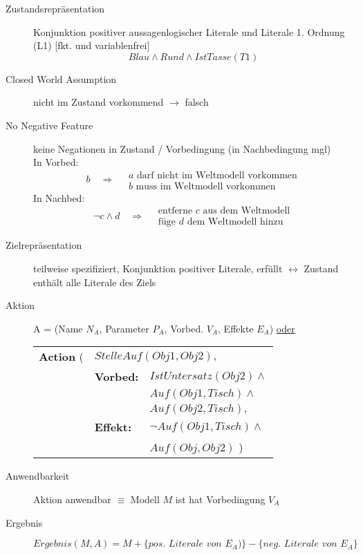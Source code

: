 \begin{description}
	\item[Zustandsrepräsentation] Konjunktion positiver aussagenlogischer Literale und Literale 1. Ordnung (L1) [fkt. und variablenfrei] $$Blau \wedge Rund \wedge IstTasse(T1)$$
	\item[Closed World Assumption] nicht im Zustand vorkommend $\to$ falsch
	\item[No Negative Feature] keine Negationen in Zustand / Vorbedingung (in Nachbedingung mgl) \\
	In Vorbed: $$b \quad \Rightarrow \quad \begin{array}{l} a \textrm{ darf nicht im Weltmodell vorkommen} \\ b \textrm{ muss im Weltmodell vorkommen} \end{array}$$
	In Nachbed: $$\neg c \wedge d \quad \Rightarrow \quad \begin{array}{l} \textrm{entferne } c \textrm{ aus dem Weltmodell} \\ \textrm{füge } d \textrm{ dem Weltmodell hinzu} \end{array}$$
	\item[Zielrepräsentation] teilweise spezifiziert, Konjunktion positiver Literale, erfüllt $\leftrightarrow$ Zustand enthält alle Literale des Ziels
	\item[Aktion] A = (Name $N_A$, Parameter $P_A$, Vorbed. $V_A$, Effekte $E_A$) \underline{oder} 
\begin{center}
\begin{tabular}{lll}
\textbf{Action} ( & \multicolumn{2}{l}{$StelleAuf(Obj1, Obj2),$} \\
& \textbf{Vorbed:} & $IstUntersatz(Obj2) \wedge$ \\ && $Auf(Obj1, Tisch) \wedge$ \\ && $Auf(Obj2, Tisch),$ \\
& \textbf{Effekt:} & $\neg Auf(Obj1, Tisch) \wedge$ \\ && $Auf(Obj, Obj2)$ \qquad \quad )
\end{tabular}
\end{center}
	\item[Anwendbarkeit] Aktion anwendbar $\equiv$ Modell $M$ ist hat Vorbedingung $V_A$
	\item[Ergebnis] $\textit{Ergebnis}(M, A) = M + \{ \textit{pos. Literale von } E_A) \} - \{ \textit{neg. Literale von } E_A \}$
\end{description}

